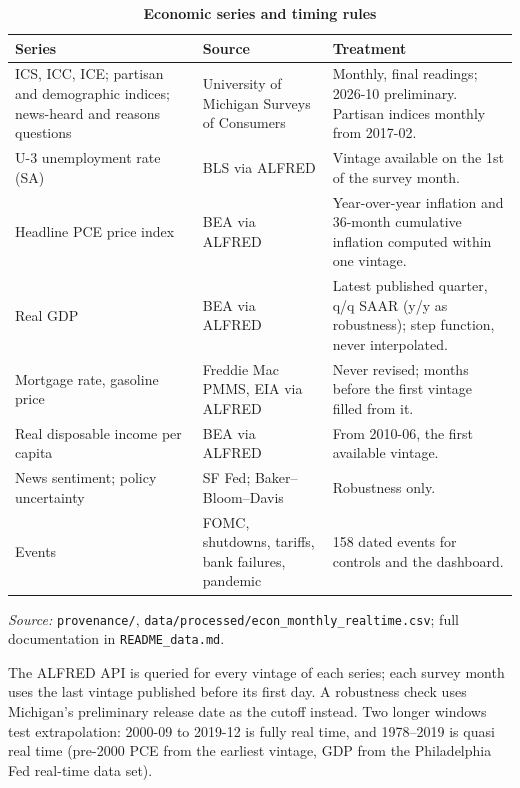 \documentclass[11pt]{article}
\begin{document}
\begin{table}[htbp]
\centering
\begin{threeparttable}
\caption{\textbf{Economic series and timing rules}}
\label{tab:data}
\footnotesize
\begin{tabularx}{\textwidth}{@{}>{\raggedright\arraybackslash}p{} >{\raggedright\arraybackslash}p{} X@{}}
\toprule
Series & Source & Treatment\\
\midrule
ICS, ICC, ICE; partisan and demographic indices; news-heard and reasons questions & University of Michigan Surveys of Consumers & Monthly, final readings; 2026-10 preliminary. Partisan indices monthly from 2017-02.\\
U-3 unemployment rate (SA) & BLS via ALFRED & Vintage available on the 1st of the survey month.\\
Headline PCE price index & BEA via ALFRED & Year-over-year inflation and 36-month cumulative inflation computed within one vintage.\\
Real GDP & BEA via ALFRED & Latest published quarter, q/q SAAR (y/y as robustness); step function, never interpolated.\\
Mortgage rate, gasoline price & Freddie Mac PMMS, EIA via ALFRED & Never revised; months before the first vintage filled from it.\\
Real disposable income per capita & BEA via ALFRED & From 2010-06, the first available vintage.\\
News sentiment; policy uncertainty & SF Fed; Baker–Bloom–Davis & Robustness only.\\
Events & FOMC, shutdowns, tariffs, bank failures, pandemic & 158 dated events for controls and the dashboard.\\
\bottomrule
\end{tabularx}
\begin{tablenotes}[flushleft]\footnotesize
\item \textit{Source:} \texttt{provenance/}, \texttt{data/processed/econ\_monthly\_realtime.csv}; full documentation in \texttt{README\_data.md}.
\end{tablenotes}
\end{threeparttable}
\end{table}

The ALFRED API is queried for every vintage of each series; each survey month uses the last vintage published before its first day. A robustness check uses Michigan's preliminary release date as the cutoff instead. Two longer windows test extrapolation: 2000-09 to 2019-12 is fully real time, and 1978–2019 is quasi real time (pre-2000 PCE from the earliest vintage, GDP from the Philadelphia Fed real-time data set).
\end{document}
